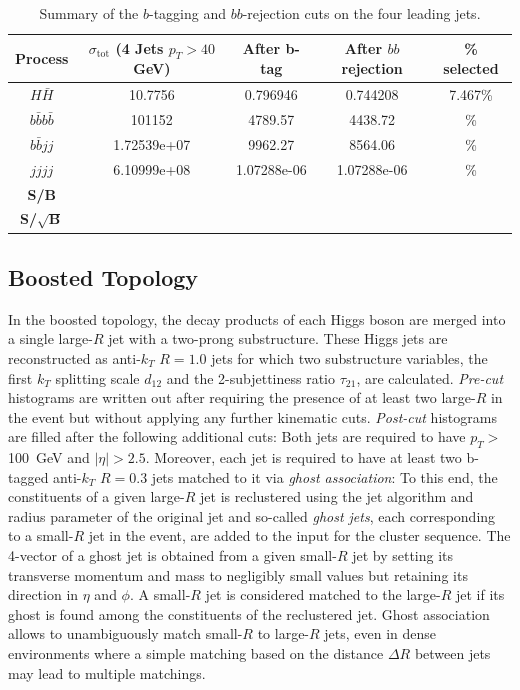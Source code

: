 \documentclass[12pt]{article}
\begin{document}
\begin{table}[h]
\begin{center}
\begin{tabular}{|c|c|c|c|c|}
\hline
Process & $\sigma_{\mathrm{tot}}$ (4 Jets $p_T>40$ GeV) & After b-tag & After $bb$ rejection & \% selected  \\
\hline \hline
$H\bar{H}$ &10.7756 & 0.796946 & 0.744208 & 7.467\% \\
\hline
$b\bar{b}b\bar{b}$ & 101152 & 4789.57 & 4438.72 & \% \\
$b\bar{b}jj$ & 1.72539e+07 & 9962.27 & 8564.06 & \% \\
$jjjj$ & 6.10999e+08 & 1.07288e-06 & 1.07288e-06 & \% \\
\hline
\textbf{S/B} & & & & \multicolumn{1}{c}{}\\
\cline{1-3}
\textbf{S/$\sqrt{\mathrm{\textbf{B}}}$} & & & & \multicolumn{1}{c}{}\\
\cline{1-3}
\end{tabular}
\end{center}
\caption{Summary of the $b$-tagging and $bb$-rejection cuts on the four leading jets.}\label{tab:TestbbTagUCL}
\end{table}%


\subsection{Boosted Topology}\label{sec:Boosted_FR}

In the boosted topology, the decay products of each Higgs boson are merged into a single large-$R$ jet with a two-prong substructure. 
These Higgs jets are reconstructed as anti-$k_T$ $R=1.0$ jets for which two substructure variables, the first $k_T$ splitting scale $d_{12}$
and the 2-subjettiness ratio $\tau_{21}$, are calculated.
\textit{Pre-cut} histograms are written out after requiring the presence of at least two large-$R$ in the event but without applying any further
kinematic cuts. \textit{Post-cut} histograms are filled after the following additional cuts: 
Both jets are required to have $p_T >$100~GeV and $|\eta|>2.5$. Moreover, each jet is required to have at least two b-tagged anti-$k_T$ $R=0.3$ 
jets matched to it via \textit{ghost association}: 
To this end, the constituents of a given large-$R$ jet is reclustered using the jet algorithm 
and radius parameter of the original jet and so-called \textit{ghost jets}, each corresponding to a small-$R$ jet in the event, 
are added to the input for the cluster sequence. The 4-vector of a ghost jet is obtained from a given small-$R$ jet 
by setting its transverse momentum and mass to negligibly small values but retaining its direction in $\eta$ and $\phi$. A small-$R$ jet is 
considered matched to the large-$R$ jet if its ghost is found among the constituents of the reclustered jet. Ghost association allows to unambiguously
match small-$R$ to large-$R$ jets, even in dense environments where a simple matching based on the distance $\Delta R$ between jets 
may lead to multiple matchings.
\end{document}
